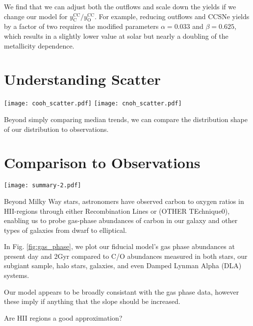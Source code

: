 \documentclass[12pt,oneside]{book}
\newcommand{\caah}{[C/Mg]-[Mg/H]}
\begin{document}
We find that we can adjust both the outflows and scale down the yields if we change our model for $y_\text{C}^\text{CC}/y_\text{O}^\text{CC}$. For example, reducing outflows and CCSNe yields by a factor of two requires the modified parameters
$\alpha = 0.033$ and $\beta = 0.625$, which results in a slightly lower value at solar but nearly a doubling of the metallicity dependence.

\section{Understanding Scatter}

\begin{figure*}
    \texttt{[image: cooh\_scatter.pdf]}
    \texttt{[image: cnoh\_scatter.pdf]}
    \caption{The simulated stars of our model at present day plotted on \caah~and colored such that lighter colors represent stars born at greater galactric radii.}
\end{figure*}

Beyond simply comparing median trends, we can compare the distribution 
shape of our distribution to observations. 

\section{Comparison to Observations}

\begin{figure*}
\centering
\texttt{[image: summary-2.pdf]}
\caption{Present-day gas phase tracks of the fiducial model in \caah~space. M101 is valid comparison to MW ...(van Dokkum et al. 2014)}
\label{fig:gas_phase}
\end{figure*}

Beyond Milky Way stars, astronomers have observed carbon to oxygen ratios in
HII-regions through either Recombination Lines or (OTHER TEchnique0), enabling
us to probe gas-phase abundances of carbon in our galaxy and other types of
galaxies from dwarf to elliptical. 

In Fig. \ref{fig:gas_phase}, we plot our fiducial model's gas phase abundances
at present day and 2Gyr compared to C/O
abundances measured in both stars, our subgiant sample, halo stars, galaxies,
and even Damped Lynman Alpha (DLA) systems. 

Our model appears to be broadly consistant with the gas phase data, however these imply if anything that the slope should be increased. 

Are HII regions a good approximation?
\end{document}
